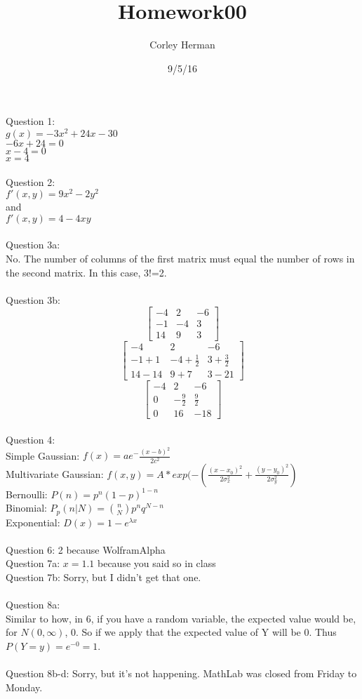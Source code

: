 \documentclass[a4paper]{article}
\title{Homework00}
\author{Corley Herman}
\date{9/5/16}
\begin{document}
\lstset{language=Python}

\maketitle

Question 1:\\
$g(x)=-3x^2+24x-30$\\
$-6x+24=0$\\
$x-4=0$\\
$x=4$\\
\\
Question 2:\\
$f'(x,y)=9x^2-2y^2$\\
and\\
$f'(x,y)=4-4xy$\\
\\
Question 3a:\\
No. The number of columns of the first matrix must equal the number of rows in the second matrix. In this case, 3!=2.\\
\\
Question 3b:\[ \left[ \begin{array}{rrr}
-4 & 2 & -6 \\
-1 & -4 & 3 \\
14 & 9 & 3 \end{array} \right] \]
\[ \left[ \begin{array}{ccc}
-4 & 2 & -6 \\
-1+1 & -4+\frac{1}{2} & 3+\frac{3}{2} \\
14-14 & 9+7 & 3-21 \end{array} \right] \]
\[ \left[ \begin{array}{rrr}
-4 & 2 & -6 \\
0 & -\frac{9}{2} & \frac{9}{2} \\
0 & 16 & -18 \end{array} \right] \]
\\
Question 4:\\
Simple Gaussian: $f(x)=ae^-\frac{(x-b)^2}{2c^2}$\\
Multivariate Gaussian: $f(x,y) = A*exp(-(\frac{(x-x_0)^2}{2\sigma_x^2}+\frac{(y-y_0)^2}{2\sigma_y^2})$\\
Bernoulli: $P(n)=p^n(1-p)^{1-n}$\\
Binomial: $P_p(n|N)=\binom{n}{N}p^nq^{N-n}$\\
Exponential: $D(x)=1-e^{\lambda x}$\\
\\
Question 6: 2 because WolframAlpha\\
Question 7a: $x=1.1$ because you said so in class\\
Question 7b: Sorry, but I didn't get that one.\\
\\
Question 8a:\\
Similar to how, in 6, if you have a random variable, the expected value would be, for $N(0,\infty)$, 0. So if we apply that the expected value of Y will be 0. Thus $P(Y=y)=e^{-0}=1$.\\
\\
Question 8b-d: Sorry, but it's not happening. MathLab was closed from Friday to Monday.\\
\end{document}
